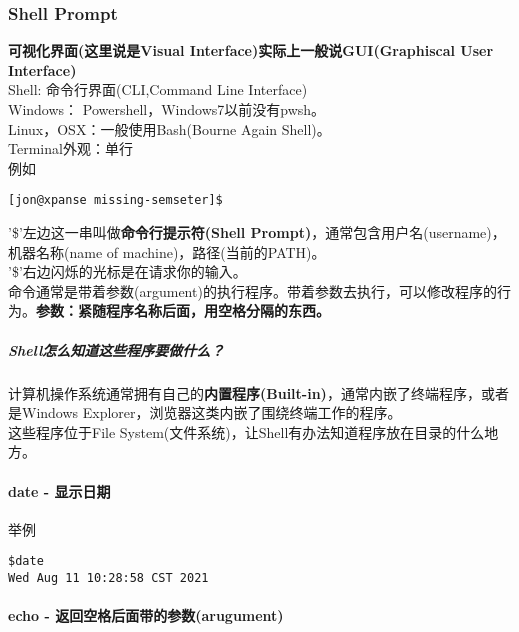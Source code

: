 \documentclass[
]{article}
\author{}
\date{}
\begin{document}
\hypertarget{shell-prompt}{%
\subsubsection{Shell Prompt}\label{shell-prompt}}

\textbf{可视化界面(这里说是Visual Interface)实际上一般说GUI(Graphiscal
User Interface)}\\
Shell: 命令行界面(CLI,Command Line Interface)\\
Windows： Powershell，Windows7以前没有pwsh。\\
Linux，OSX：一般使用Bash(Bourne Again Shell)。\\
Terminal外观：单行\\
例如

\begin{verbatim}
[jon@xpanse missing-semseter]$
\end{verbatim}

'\$'左边这一串叫做\textbf{命令行提示符(Shell
Prompt)}，通常包含用户名(username)，机器名称(name of
machine)，路径(当前的PATH)。\\
'\$'右边闪烁的光标是在请求你的输入。\\
命令通常是带着参数(argument)的执行程序。带着参数去执行，可以修改程序的行为。\textbf{参数：紧随程序名称后面，用空格分隔的东西。}

\hypertarget{shellux600eux4e48ux77e5ux9053ux8fd9ux4e9bux7a0bux5e8fux8981ux505aux4ec0ux4e48}{%
\subparagraph{Shell怎么知道这些程序要做什么？}\label{shellux600eux4e48ux77e5ux9053ux8fd9ux4e9bux7a0bux5e8fux8981ux505aux4ec0ux4e48}}

计算机操作系统通常拥有自己的\textbf{内置程序(Built-in)}，通常内嵌了终端程序，或者是Windows
Explorer，浏览器这类内嵌了围绕终端工作的程序。\\
这些程序位于File
System(文件系统)，让Shell有办法知道程序放在目录的什么地方。

\hypertarget{date---ux663eux793aux65e5ux671f}{%
\paragraph{date - 显示日期}\label{date---ux663eux793aux65e5ux671f}}

举例

\begin{verbatim}
$date
Wed Aug 11 10:28:58 CST 2021
\end{verbatim}

\hypertarget{echo---ux8fd4ux56deux7a7aux683cux540eux9762ux5e26ux7684ux53c2ux6570arugument}{%
\paragraph{echo -
返回空格后面带的参数(arugument)}\label{echo---ux8fd4ux56deux7a7aux683cux540eux9762ux5e26ux7684ux53c2ux6570arugument}}
\end{document}
